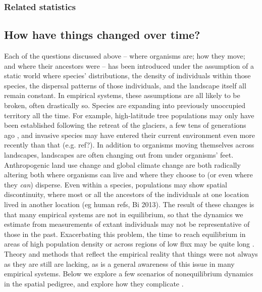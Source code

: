 \documentclass{ar-1col}
\newcommand{\g}[1]{{\color{blue}{#1}}}
\newcommand{\todo}[1]{{\textbf{\color{red}{#1}}}}
\begin{document}
\subsubsection{Related statistics}

\todo{Fst, various IBD-metrics???}


\subsection{How have things changed over time?}

Each of the questions discussed above --
where organisms are;
how they move;
and where their ancestors were
-- has been introduced under the assumption of a static world
where species' distributions,
the density of individuals within those species,
the dispersal patterns of those individuals,
and the landscape itself all remain constant.
In empirical systems,
these assumptions are all likely to be broken,
often drastically so.
Species are expanding into previously unoccupied territory all the time.
For example, 
high-latitude tree populations may only have been established
following the retreat of the glaciers,
a few tens of generations ago \cite{WhitlockMcCauley1999},
and invasive species may have entered their current
environment even more recently than that (e.g. ref?).
In addition to organisms moving themselves across landscapes,
landscapes are often changing out from under organisms' feet.
Anthropogenic land use change
and global climate change
are both radically altering both where organisms can live
and where they choose to
(or even where they \textit{can}) disperse.
Even within a species,
populations may show spatial discontinuity,
where most or all the ancestors of the individuals at one location
lived in another location (eg human refs, Bi 2013).
The result of these changes is that many empirical systems
are not in equilibrium,
so that the dynamics we estimate from
measurements of extant individuals may
not be representative of those in the past.
Exacerbating this problem,
the time to reach equilibrium
in areas of high population density
or across regions of low flux
may be quite long
\cite{WhitlockMcCauley1999, CrowAoki1984, Whitlock1992,Slatkin1993}.
Theory and methods that
reflect the empirical reality that things were not always as they are
still are lacking, 
as is a general awareness of this issue in many empirical systems.
Below we explore a few scenarios of nonequilibrium dynamics
in the spatial pedigree,
and explore how they complicate \g{inference}.
\end{document}

